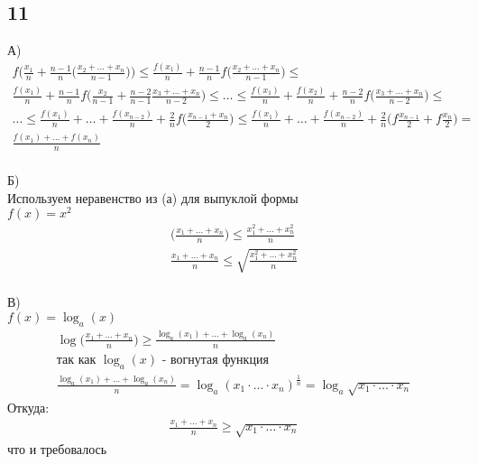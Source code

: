 		\subsection{11}
		А)\\
		\begin{gather*}
			f\bigg( \frac{x_1}{n} + \frac{n-1}{n} \bigg( \frac{x_2 + \ldots + x_n}{n-1} \bigg) \bigg) \leqslant
			\frac{f(x_1)}{n} + \frac{n-1}{n} f \bigg( \frac{x_2 + \ldots + x_n}{n-1} \bigg) \leqslant \\
			\frac{f(x_1)}{n} + \frac{n-1}{n} f \bigg( \frac{x_2}{n-1} + \frac{n-2}{n-1}\frac{x_3 + \ldots + x_n}{n-2} \bigg) \leqslant
			\ldots \leqslant 
			\frac{f(x_1)}{n} + \frac{f(x_2)}{n} + \frac{n-2}{n} f \bigg( \frac{x_3 + \ldots + x_n}{n-2} \bigg) \leqslant \\
			\ldots \leqslant
			\frac{f(x_1)}{n} + \ldots + \frac{f(x_{n-2})}{n} + \frac{2}{n} f \bigg( \frac{x_{n-1} + x_{n}}{2} \bigg) \leqslant
			\frac{f(x_1)}{n} + \ldots + \frac{f(x_{n-2})}{n} + \frac{2}{n} \bigg( f  \frac{x_{n-1}}{2} + f \frac{x_{n}}{2} \bigg) = \\
			\frac{f(x_1) + \ldots + f(x_n)}{n}	
		\end{gather*}
		\\
		Б)\\
		Используем неравенство из (а) для выпуклой формы\\
		$f(x) = x^2$
		\begin{gather*}
			\bigg( \frac{x_1 + \ldots + x_n}{n} \bigg) \leqslant \frac{x^2_1 + \ldots + x^2_n}{n}\\
			\frac{x_1 + \ldots + x_n}{n} \leqslant \sqrt{\frac{x^2_1 + \ldots + x^2_n}{n}}
		\end{gather*}
		\\
		В)\\
		$f(x) = \log_a(x)$
		\begin{gather*}
			\log \bigg(\frac{x_1 + \ldots + x_n}{n} \bigg) \geqslant \frac{\log_a(x_1) + \ldots + \log_a(x_n)}{n}\\
			\text{так как $\log_a(x)$ - вогнутая функция}\\
			\frac{\log_a(x_1) + \ldots + \log_a(x_n)}{n} = \log_a(x_1 \cdot \ldots \cdot x_n)^{\frac{1}{n}} =
			\log_a{\sqrt{x_1 \cdot \ldots \cdot x_n}}
		\end{gather*}
		Откуда:
		\begin{gather*}
			\frac{x_1 + \ldots + x_n}{n} \geqslant \sqrt{x_1 \cdot \ldots \cdot x_n}
		\end{gather*}
		что и требовалось
		\\
		
